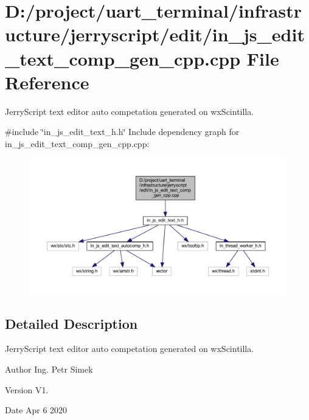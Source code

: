 \section{D\+:/project/uart\+\_\+terminal/infrastructure/jerryscript/edit/in\+\_\+js\+\_\+edit\+\_\+text\+\_\+comp\+\_\+gen\+\_\+cpp.cpp File Reference}
\label{in__js__edit__text__comp__gen__cpp_8cpp}


Jerry\+Script text editor auto competation generated on wx\+Scintilla.  


{\ttfamily \#include \char`\"{}in\+\_\+js\+\_\+edit\+\_\+text\+\_\+h.\+h\char`\"{}}\newline
Include dependency graph for in\+\_\+js\+\_\+edit\+\_\+text\+\_\+comp\+\_\+gen\+\_\+cpp.\+cpp\+:
\nopagebreak
\begin{figure}[H]
\begin{center}
\leavevmode
\includegraphics[width=350pt]{in__js__edit__text__comp__gen__cpp_8cpp__incl}
\end{center}
\end{figure}


\subsection{Detailed Description}
Jerry\+Script text editor auto competation generated on wx\+Scintilla. 

\begin{DoxyAuthor}{Author}
Ing. Petr Simek 
\end{DoxyAuthor}
\begin{DoxyVersion}{Version}
V1. 
\end{DoxyVersion}
\begin{DoxyDate}{Date}
Apr 6 2020 
\end{DoxyDate}
